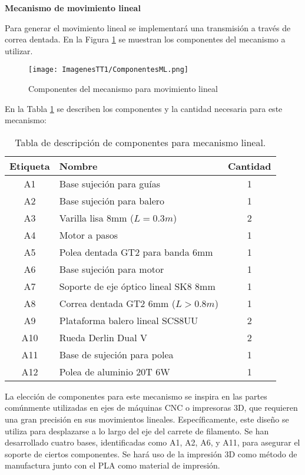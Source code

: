 \documentclass[14pt,oneside]{extarticle} %
\begin{document}
\textbf{Mecanismo de movimiento lineal}

Para generar el movimiento lineal se implementará una transmisión a través de correa dentada. En la Figura \ref{fig:ComponentesML} se muestran los componentes del mecanismo a utilizar.

\begin{figure}[H]
    \centering
    \texttt{[image: ImagenesTT1/ComponentesML.png]}
    \caption{Componentes del mecanismo para movimiento lineal \cite{extrusoraPLA}}
    \label{fig:ComponentesML}
\end{figure}

\vspace{-1cm}

En la Tabla \ref{tab:MecanismoLineal} se describen los componentes y la cantidad necesaria para este mecanismo:

\begin{table}[H]
\centering
\begin{tabular}{|c|l|c|}
\hline
\textbf{Etiqueta} & \textbf{Nombre} & \textbf{Cantidad} \\ \hline
A1 & Base sujeción para guías & 1 \\ \hline
A2 & Base sujeción para balero & 1 \\ \hline
A3 & Varilla lisa 8mm (\(L = 0.3m\)) & 2 \\ \hline
A4 & Motor a pasos & 1 \\ \hline
A5 & Polea dentada GT2 para banda 6mm & 1 \\ \hline
A6 & Base sujeción para motor & 1 \\ \hline
A7 & Soporte de eje óptico lineal SK8 8mm & 1 \\ \hline
A8 & Correa dentada GT2 6mm (\(L > 0.8m\)) & 1 \\ \hline
A9 & Plataforma balero lineal SCS8UU & 2 \\ \hline
A10 & Rueda Derlin Dual V & 2 \\ \hline
A11 & Base de sujeción para polea & 1 \\ \hline
A12 & Polea de aluminio 20T 6W & 1 \\ \hline
\end{tabular}
\caption{Tabla de descripción de componentes para mecanismo lineal.}
\label{tab:MecanismoLineal}
\end{table}

La elección de componentes para este mecanismo se inspira en las partes comúnmente utilizadas en ejes de máquinas CNC o impresoras 3D, que requieren una gran precisión en sus movimientos lineales. Específicamente, este diseño se utiliza para desplazarse a lo largo del eje del carrete de filamento. Se han desarrollado cuatro bases, identificadas como A1, A2, A6, y A11, para asegurar el soporte de ciertos componentes. Se hará uso de la impresión 3D como método de manufactura junto con el PLA como material de impresión.
\end{document}
